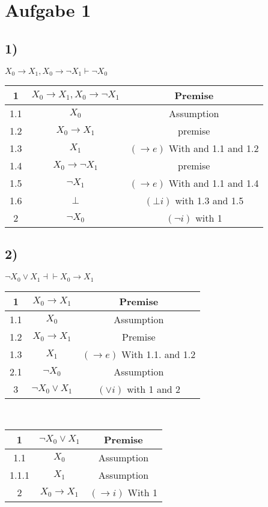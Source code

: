 \section*{Aufgabe 1}

\subsection*{1)}
$X_0 \rightarrow X_1 , X_0 \rightarrow \neg X_1 \vdash \neg X_0$\\

\begin{tabular}{c |c | c}
1 &$X_0 \rightarrow X_1 , X_0 \rightarrow \neg X_1$ & Premise\\
\hline
1.1 & $X_0$ & Assumption\\
1.2 & $X_0 \rightarrow X_1$ & premise \\
1.3 & $X_1$ & $(\rightarrow e)$ With  and 1.1 and 1.2 \\

1.4 & $X_0 \rightarrow \neg X_1$ & premise \\
1.5 & $\neg X_1$ & $(\rightarrow e)$ With  and 1.1 and 1.4 \\
1.6 & $\bot$ & $(\bot i)$ with 1.3 and 1.5\\
\hline
2 & $\neg X_0$ & $(\neg i)$ with 1

\end{tabular}


\subsection*{2)}
$\neg X_0 \vee X_1 \dashv \vdash X_0 \rightarrow X_1 $\\

\begin{tabular}{c |c | c}
1 & $X_0 \rightarrow X_1 $ & Premise\\
\hline
1.1 &  $X_0$ & Assumption\\
1.2 & $X_0 \rightarrow X_1 $ & Premise\\
1.3 & $X_1$ & $(\rightarrow e)$ With 1.1. and 1.2\\
\hline
2.1 & $\neg X_0$ & Assumption\\
3 & $\neg X_0 \vee X_1$ & $(\vee i)$ with 1 and 2\\


\end{tabular}\\


\begin{tabular}{c |c | c}
1 & $\neg X_0 \vee X_1$ & Premise\\
\hline
1.1 &  $X_0$ & Assumption\\
\hline
1.1.1 & $ X_1$ & Assumption\\
2 & $ X_0 \rightarrow X_1 $ & $(\rightarrow i)$ With 1 \\
\end{tabular}

